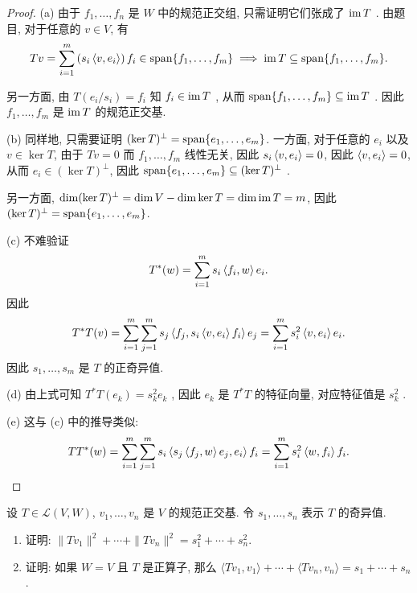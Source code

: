 \documentclass{article}
\begin{document}
\begin{proof}
  (a) 由于 \( f_1,\dots,f_n \) 是 \( W \) 中的规范正交组, 只需证明它们张成了 \( \operatorname{im} T \) . 由题目, 对于任意的 \( v\in V \), 有
  \[ Tv=\sum_{i=1}^{m}\left( s_i \left\langle v, e_i \right\rangle \right)f_i\in\operatorname{span}\{f_1,\dots,f_m\}
  \implies \operatorname{im} T \subseteq \operatorname{span}\{f_1,\dots,f_m\}. \]

  另一方面, 由 \( T(e_i/s_i)=f_i \) 知 \( f_i\in\operatorname{im} T \) , 从而 \( \operatorname{span}\{f_1,\dots,f_m\}\subseteq \operatorname{im} T \) . 因此 \( f_1,\dots,f_m \) 是 \( \operatorname{im} T \) 的规范正交基.

  (b) 同样地, 只需要证明 \( (\ker T)^\perp=\operatorname{span}\{e_1,\dots,e_m\} \). 一方面, 对于任意的 \( e_i \) 以及 \( v\in\ker T \), 由于 \( Tv=0 \) 而 \( f_1,\dots,f_m \) 线性无关, 因此 \( s_i \left\langle v, e_i \right\rangle=0 \), 因此 \( \left\langle v, e_i \right\rangle=0 \), 从而 \( e_i\in(\ker T)^\perp \), 因此 \( \operatorname{span}\{e_1,\dots,e_m\}\subseteq (\ker T)^\perp \) .

  另一方面, \( \dim (\ker T)^\perp=\dim V-\dim\ker T=\dim\operatorname{im} T= m \), 因此 \( (\ker T)^\perp=\operatorname{span}\{e_1,\dots,e_m\} \).

  (c) 不难验证
  \[ T^*(w)=\sum_{i=1}^{m}s_i \left\langle f_i, w \right\rangle e_i. \]
  因此
  \[ T^*T(v)=\sum_{i=1}^{m}\sum_{j=1}^{m}s_j \left\langle f_j, s_i \left\langle v, e_i \right\rangle f_i \right\rangle e_j
  =\sum_{i=1}^{m}s_i^2 \left\langle v, e_i \right\rangle e_i. \]
  因此 \( s_1,\dots,s_m \) 是 \( T \) 的正奇异值.

  (d) 由上式可知 \( T^*T(e_k)=s_k^2 e_k \) , 因此 \( e_k \) 是 \( T^*T \) 的特征向量, 对应特征值是 \( s_k^2 \) .

  (e) 这与 (c) 中的推导类似:
  \[ TT^*(w)=\sum_{i=1}^{m} \sum_{j=1}^{m} s_i \left\langle s_j \left\langle f_j, w \right\rangle e_j, e_i \right\rangle f_i
  =\sum_{i=1}^{m}s_i^2 \left\langle w, f_i \right\rangle f_i. \]
\end{proof}



\begin{problem}[7E-11]
设 $T \in \mathcal{L}(V, W)$, $v_1, \ldots, v_n$ 是 $V$ 的规范正交基. 令 $s_1, \ldots, s_n$ 表示 $T$ 的奇异值.
\begin{enumerate}[label=(\alph*)]
\item 证明: $\|T v_1\|^2 + \cdots + \|T v_n\|^2 = s_1^2 + \cdots + s_n^2$.
\item 证明: 如果 $W = V$ 且 $T$ 是正算子, 那么 $\langle T v_1, v_1 \rangle + \cdots + \langle T v_n, v_n \rangle = s_1 + \cdots + s_n$.
\end{enumerate}
\end{problem}
\end{document}
